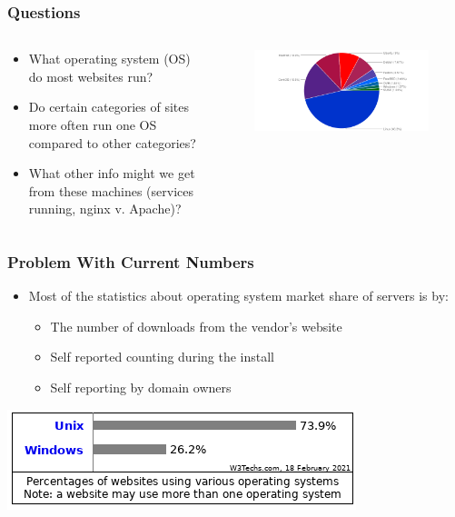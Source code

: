 \documentclass{beamer}
\theoremstyle{definition}
\begin{document}
\begin{frame}
\frametitle{Questions}

\begin{columns}
\begin{column}{0.4\textwidth}
\begin{itemize}
\item What operating system (OS) do most websites run?
\item Do certain categories of sites more often run one OS compared to other categories?
\item What other info might we get from these machines (services running, nginx v. Apache)?
\end{itemize}
\end{column}
\begin{column}{0.8\textwidth}
\begin{figure}
\centering
\includegraphics[scale=0.4]{graphics/market.png}
\caption{\cite{solvedns}}
\end{figure}
\end{column}
\end{columns}
\end{frame}





\begin{frame}
\frametitle{Problem With Current Numbers}

\begin{itemize}
\item Most of the statistics about operating system market share
of servers is by:
\begin{itemize}
\item The number of downloads from the vendor's website
\item Self reported counting during the install
\item Self reporting by domain owners
\end{itemize}

\end{itemize}

\centering
\includegraphics[scale=0.75]{graphics/w3tech.png}
\end{frame}
\end{document}
